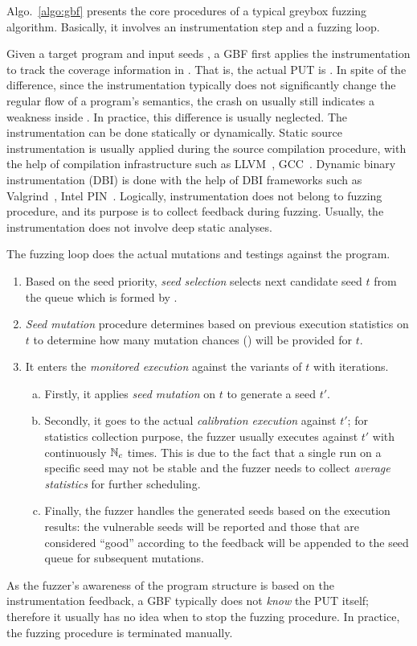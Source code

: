 Algo.~\ref{algo:gbf} presents the core procedures of a typical greybox fuzzing algorithm. Basically, it involves an instrumentation step and a fuzzing loop.

Given a target program \ProgO and input seeds \Seeds, a GBF first applies the instrumentation to track the coverage information in \ProgO. That is, the actual PUT is \Prog. In spite of the difference, since the instrumentation typically does not significantly change the regular flow of a program's semantics, the crash on \Prog usually still indicates a weakness inside \ProgO. In practice, this difference is usually neglected.
The instrumentation can be done statically or dynamically. Static source instrumentation is usually applied during the source compilation procedure, with the help of compilation infrastructure such as LLVM~\cite{Lattner:2004:LCF:977395.977673}, GCC~\cite{gcc}. Dynamic binary instrumentation (DBI) is done with the help of DBI frameworks such as Valgrind~\cite{valgrind}, Intel PIN~\cite{pin}. Logically, instrumentation does not belong to fuzzing procedure, and its purpose is to collect feedback during fuzzing. Usually, the instrumentation does not involve deep static analyses.


The fuzzing loop does the actual mutations and testings against the program.
\begin{enumerate}[1.]
	\item Based on the seed priority, \emph{seed selection} selects next candidate seed $t$ from the queue which is formed by \Seeds.
	\item \emph{Seed mutation} procedure determines based on previous execution statistics on $t$ to determine how many mutation chances (\mutChance) will be provided for $t$.
	\item It enters the \emph{monitored execution} against the variants of $t$ with \mutChance iterations. 
	\begin{enumerate}[a)]
	\item Firstly, it applies \emph{seed mutation} on $t$ to generate a seed $t'$. 
	\item Secondly, it goes to the actual \emph{calibration execution} against $t'$; for statistics collection purpose, the fuzzer usually executes \Prog against $t'$ with continuously $\mathbb{N}_{c}$ times. This is due to the fact that a single run on a specific seed may not be stable and the fuzzer needs to collect \emph{average statistics} for further scheduling.
	\item Finally, the fuzzer handles the generated seeds based on the execution results: the vulnerable seeds will be reported and those that are considered ``good'' according to the feedback will be appended to the seed queue for subsequent mutations.
	\end{enumerate}
\end{enumerate}
As the fuzzer's awareness of the program structure is based on the instrumentation feedback, a GBF typically does not \emph{know} the PUT itself; therefore it usually has no idea when to stop the fuzzing procedure. In practice, the fuzzing procedure is terminated manually.

